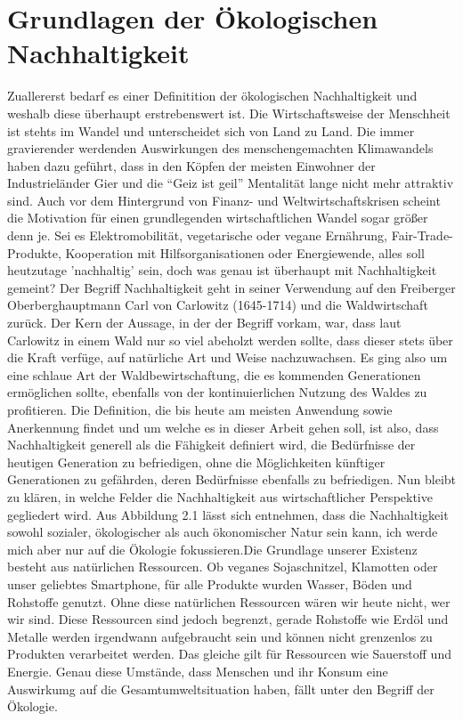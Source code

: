\chapter{Grundlagen der Ökologischen Nachhaltigkeit}

Zuallererst bedarf es einer Definitition der ökologischen Nachhaltigkeit und weshalb diese überhaupt erstrebenswert ist. Die Wirtschaftsweise der Menschheit ist stehts im Wandel und unterscheidet sich von Land zu Land. Die immer gravierender werdenden Auswirkungen des menschengemachten Klimawandels haben dazu geführt, dass in den Köpfen der meisten Einwohner der Industrieländer Gier und die ``Geiz ist geil'' Mentalität lange nicht mehr attraktiv sind. Auch vor dem Hintergrund von Finanz- und Weltwirtschaftskrisen scheint die Motivation für einen grundlegenden wirtschaftlichen Wandel sogar größer denn je. Sei es Elektromobilität, vegetarische oder vegane Ernährung, Fair-Trade-Produkte, Kooperation mit Hilfsorganisationen oder Energiewende, alles soll heutzutage 'nachhaltig' sein, doch was genau ist überhaupt mit Nachhaltigkeit gemeint? \newline Der Begriff Nachhaltigkeit geht in seiner Verwendung auf den Freiberger Oberberghauptmann Carl von Carlowitz (1645-1714) und die Waldwirtschaft zurück\cite{doi:nachhaltig}. Der Kern der Aussage, in der der Begriff vorkam, war, dass laut Carlowitz in einem Wald nur so viel abeholzt werden sollte, dass dieser stets über die Kraft verfüge, auf natürliche Art und Weise nachzuwachsen. Es ging also um eine schlaue Art der Waldbewirtschaftung, die es kommenden Generationen ermöglichen sollte, ebenfalls von der kontinuierlichen Nutzung des Waldes zu profitieren. Die Definition, die bis heute am meisten Anwendung sowie Anerkennung findet und um welche es in dieser Arbeit gehen soll, ist also, dass Nachhaltigkeit generell als die Fähigkeit definiert wird, die Bedürfnisse der heutigen Generation zu befriedigen, ohne die Möglichkeiten künftiger Generationen zu gefährden, deren Bedürfnisse ebenfalls zu befriedigen. \clearpage Nun bleibt zu klären, in welche Felder die Nachhaltigkeit aus wirtschaftlicher Perspektive gegliedert wird. Aus Abbildung 2.1 lässt sich entnehmen, dass die Nachhaltigkeit sowohl sozialer, ökologischer als auch ökonomischer Natur sein kann, ich werde mich aber nur auf die Ökologie fokussieren.\newline Die Grundlage unserer Existenz besteht aus natürlichen Ressourcen. Ob veganes Sojaschnitzel, Klamotten oder unser geliebtes Smartphone, für alle Produkte wurden Wasser, Böden und Rohstoffe genutzt. Ohne diese natürlichen Ressourcen wären wir heute nicht, wer wir sind. Diese Ressourcen sind jedoch begrenzt, gerade Rohstoffe wie Erdöl und Metalle werden irgendwann aufgebraucht sein und können nicht grenzenlos zu Produkten verarbeitet werden. Das gleiche gilt für Ressourcen wie Sauerstoff und Energie. Genau diese Umstände, dass Menschen und ihr Konsum eine Auswirkumg auf die Gesamtumweltsituation haben, fällt unter den Begriff der Ökologie. 
